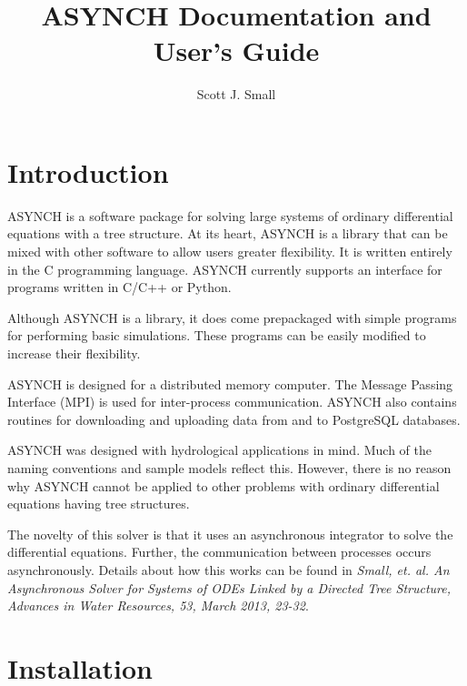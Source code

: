 \documentclass[12pt]{article}
\title{ASYNCH Documentation and User's Guide}
\author{Scott J. Small}
\begin{document}
\maketitle

\tableofcontents

%


\section{Introduction} \label{sec: introduction}

ASYNCH is a software package for solving large systems of ordinary differential equations with a tree structure. At its heart, ASYNCH is a library that can be mixed with other software to allow users greater flexibility. It is written entirely in the C programming language. ASYNCH currently supports an interface for programs written in C/C++ or Python.

Although ASYNCH is a library, it does come prepackaged with simple programs for performing basic simulations. These programs can be easily modified to increase their flexibility.

ASYNCH is designed for a distributed memory computer. The Message Passing Interface (MPI) is used for inter-process communication. ASYNCH also contains routines for downloading and uploading data from and to PostgreSQL databases.

ASYNCH was designed with hydrological applications in mind. Much of the naming conventions and sample models reflect this. However, there is no reason why ASYNCH cannot be applied to other problems with ordinary differential equations having tree structures.

The novelty of this solver is that it uses an asynchronous integrator to solve the differential equations. Further, the communication between processes occurs asynchronously. Details about how this works can be found in \emph{Small, et. al. An Asynchronous Solver for Systems of ODEs Linked by a Directed Tree Structure, Advances in Water Resources, 53, March 2013, 23-32}.

\section{Installation} \label{sec: installation}
\end{document}
